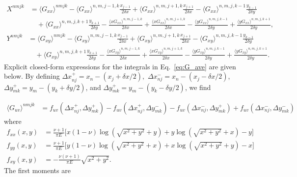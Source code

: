 \documentclass[aps,prl,reprint,twocolumn,groupedaddress,showpacs]{revtex4}
\begin{document}
\begin{widetext}
\begin{align}
X^{nmjk} & = \langle G_{xx} \rangle^{nmjk} - 
\langle G_{xx}\rangle^{n,m,j-1,k}\frac{x_{j-1}}{2\delta x}
+ \langle G_{xx} \rangle^{n,m,j+1,k}\frac{x_{j+1}}{2\delta x} 
-  \langle G_{xx} \rangle^{n,m,j,k-1}\frac{y_{k-1}}{2\delta y}  \nonumber\\
\: &\quad + \langle G_{xx} \rangle^{n,m,j,k+1}\frac{y_{k+1}}{2\delta y} 
-\frac{\langle xG_{xx} \rangle^{n,m,j-1,k}}{2\delta x}
+\frac{\langle xG_{xx} \rangle^{n,m,j+1,k}}{2\delta x} 
- \frac{\langle yG_{xx} \rangle^{n,m,j,k-1}}{2\delta y} 
+\frac{\langle yG_{xx} \rangle^{n,m,j,k+1}}{2\delta y}, 
\label{eq:linearsystemX}
\end{align}
\begin{align}
Y^{nmjk} & =  \langle G_{xy} \rangle^{nmjk} 
- \langle G_{xy} \rangle^{n,m,j-1,k}\frac{x_{j-1}}{2\delta x}
+\langle G_{xy} \rangle^{n,m,j+1,k}\frac{x_{j+1}}{2\delta x} 
- \langle G_{xy} \rangle^{n,m,j,k-1}\frac{y_{k-1}}{2\delta y} \nonumber\\
\: & \quad+\langle G_{xy} \rangle^{n,m,j,k+1}\frac{y_{k+1}}{2\delta y}  
-\frac{\langle xG_{xy} \rangle^{n,m,j-1,k}}{2\delta x}+
\frac{\langle xG_{xy} \rangle^{n,m,j+1,k}}{2\delta x} 
- \frac{\langle yG_{xy} \rangle^{n,m,j,k-1}}{2\delta y} 
+\frac{\langle yG_{xy} \rangle^{n,m,j,k+1}}{2\delta y}.
\label{eq:linearsystemY}
\end{align}
%
Explicit closed-form expressions for the integrals in
Eq.~\ref{eq:G_ave} are given below. By defining $\Delta x_{nj}^+ = x_n -
(x_j+\delta x/2),$ $\Delta x_{nj}^- = x_n - (x_j-\delta x/2)$, $\Delta
y_{mk}^+ = y_m - (y_k+\delta y/2)$, and $\Delta y_{mk}^+ = y_m -
(y_k-\delta y/2)$, we find

\begin{align}
\langle G_{uv}\rangle^{nmjk} &=   f_{uv}( \Delta x_{nj}^+,\Delta y_{mk}^+) - f_{uv}( \Delta x_{nj}^+,\Delta y_{mk}^-)
-f_{uv}(\Delta x_{nj}^-, \Delta y_{mk}^+) + f_{uv}(\Delta x_{nj}^- , \Delta y_{mk}^-)
\end{align}
where
\begin{align}
f_{xx}(x,y) &= \frac{\nu+1}{\pi E}\Bigg[ x(1-\nu ) \log\left( \sqrt{x^2+y^2}+y\right)
+ y \log\left(\sqrt{x^2+y^2} +x\right)-y  \Bigg] \label{eq:fxx} \\
f_{yy}(x,y) &= \frac{\nu+1}{\pi E}\Bigg[ y(1-\nu ) \log\left( \sqrt{x^2+y^2}+x\right)
+ x \log\left(\sqrt{x^2+y^2} +y\right)-x  \Bigg] \label{eq:fyy} \\
f_{xy}(x,y) &= -\frac{\nu(\nu+1)}{\pi E}\sqrt{x^2+y^2}. \label{eq:fxy}
\end{align}
%
The first moments are


\end{widetext}
\end{document}
